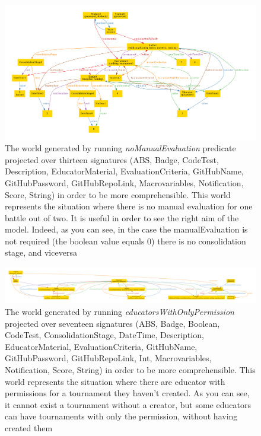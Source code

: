 \begin{figure}[h]
  \centering
  \includegraphics[width=1\linewidth]{RASD/4Alloy/res/noManualEvaluation.pdf}
  \caption{The world generated by running \textit{noManualEvaluation} predicate projected over thirteen signatures (ABS, Badge, CodeTest, Description, EducatorMaterial, EvaluationCriteria, GitHubName, GitHubPassword, GitHubRepoLink, Macrovariables, Notification, Score, String) in order to be more comprehensible. This world represents the situation where there is no manual evaluation for one battle out of two. It is useful in order to see the right aim of the model. Indeed, as you can see, in the case the manualEvaluation is not required (the boolean value equals 0) there is no consolidation stage, and viceversa}
\end{figure}

\begin{figure}[h]
  \centering
  \includegraphics[width=1\linewidth]{RASD/4Alloy/res/educatorsWithOnlyPermission.pdf}
  \caption{The world generated by running \textit{educatorsWithOnlyPermission} projected over seventeen signatures (ABS, Badge, Boolean, CodeTest, ConsolidationStage, DateTime, Description, EducatorMaterial, EvaluationCriteria, GitHubName, GitHubPassword, GitHubRepoLink, Int, Macrovariables, Notification, Score, String) in order to be more comprehensible. This world represents the situation where there are educator with permissions for a tournament they haven't created. As you can see, it cannot exist a tournament without a creator, but some educators can have tournaments with only the permission, without having created them}
\end{figure}

